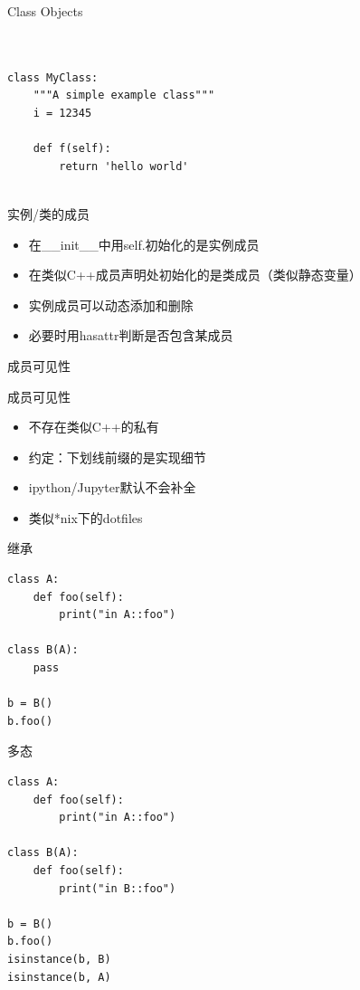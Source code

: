 \documentclass{beamer}
\begin{document}
\begin{frame}[t,fragile]{Class Objects}


\begin{verbatim}


class MyClass:
    """A simple example class"""
    i = 12345

    def f(self):
        return 'hello world'


\end{verbatim}


\end{frame}
\begin{frame}[t]{实例/类的成员}
	\begin{itemize}
		\item 在\_\_init\_\_中用self.初始化的是实例成员
		\item 在类似C++成员声明处初始化的是类成员（类似静态变量）
		\item 实例成员可以动态添加和删除
		\item 必要时用hasattr判断是否包含某成员

	\end{itemize}
	
\end{frame}
\begin{frame}[t]{成员可见性}
	\begin{block}{成员可见性}
\begin{itemize}
	\item 不存在类似C++的私有
	\item 约定：下划线前缀的是实现细节
	\item ipython/Jupyter默认不会补全
	\item 类似*nix下的dotfiles
\end{itemize}
	\end{block}
	
\end{frame}
\begin{frame}[t,fragile]{继承}
\begin{verbatim}
class A:
    def foo(self):
        print("in A::foo")

class B(A):
    pass

b = B()
b.foo()
\end{verbatim}
	
\end{frame}

\begin{frame}[t,fragile]{多态}
\begin{verbatim}
class A:
    def foo(self):
        print("in A::foo")

class B(A):
    def foo(self):
        print("in B::foo")

b = B()
b.foo()
isinstance(b, B)
isinstance(b, A)
\end{verbatim}
	
\end{frame}
\end{document}
